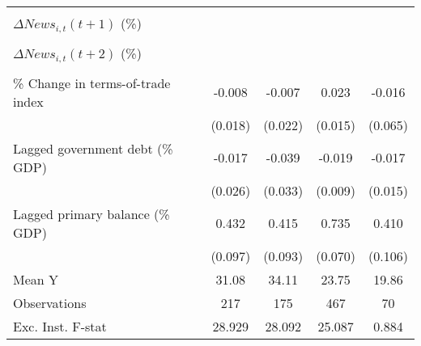 {\begin{tabular}{l*{4}{c}}
                    &                     &                     &                     &                     \\
\addlinespace
$ \Delta News_{i,t}(t+1)$ (\%)&                     &                     &                     &                     \\
                    &                     &                     &                     &                     \\
\addlinespace
$ \Delta News_{i,t}(t+2)$ (\%)&                     &                     &                     &                     \\
                    &                     &                     &                     &                     \\
\addlinespace
\% Change in terms-of-trade index&      -0.008         &      -0.007         &       0.023         &      -0.016         \\
                    &     (0.018)         &     (0.022)         &     (0.015)         &     (0.065)         \\
\addlinespace
Lagged government debt (\% GDP)&      -0.017         &      -0.039         &      -0.019\sym{**} &      -0.017         \\
                    &     (0.026)         &     (0.033)         &     (0.009)         &     (0.015)         \\
\addlinespace
Lagged primary balance (\% GDP)&       0.432\sym{***}&       0.415\sym{***}&       0.735\sym{***}&       0.410\sym{***}\\
                    &     (0.097)         &     (0.093)         &     (0.070)         &     (0.106)         \\
\midrule
Mean Y              &       31.08         &       34.11         &       23.75         &       19.86         \\
Observations        &         217         &         175         &         467         &          70         \\
Exc. Inst. F-stat   &      28.929         &      28.092         &      25.087         &       0.884         \\
\bottomrule
\end{tabular}
}
